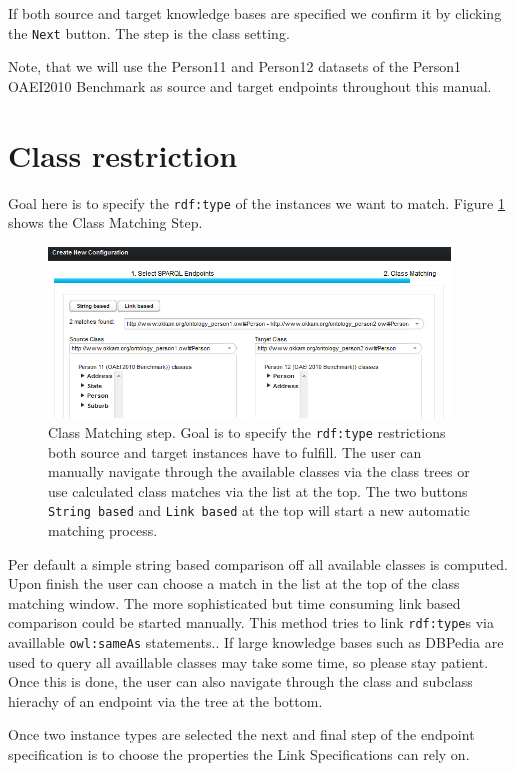 \documentclass[oneside,a4paper,12pt]{memoir}
\begin{document}
If both source and target knowledge bases are specified we confirm it by clicking the \texttt{Next} button. The step is the class setting.

 Note, that we will use the Person11 and Person12 datasets of the Person1 OAEI2010 Benchmark as source and target endpoints throughout this manual.
	\section{Class restriction}
	\label{classes}
	Goal here is to specify the \texttt{rdf:type} of the instances we want to match. Figure \ref{fig:class} shows the Class Matching Step. 
	\begin{figure}[!ht]
		\centering
		\includegraphics[width=0.95\textwidth]{images/class.png}
		\caption{Class Matching step. Goal is to specify the \texttt{rdf:type} restrictions both source and target instances have to fulfill. The user can manually navigate through the available classes via the class trees or use calculated class matches via	the list at the top. The two buttons \texttt{String based} and \texttt{Link based} at the top will start a new automatic matching process.}
		\label{fig:class}
	\end{figure}
	
	Per default a simple string based comparison off all available classes is computed. Upon finish the user can choose a match in the list at the top of the class matching window. The more sophisticated but time consuming link based comparison could be started manually. This method tries to link \texttt{rdf:type}s via availlable \texttt{owl:sameAs} statements.. If large knowledge bases such as DBPedia are used to query all availlable classes may take some time, so please stay patient. Once this is done, the user can also navigate through the class and subclass hierachy of an endpoint via the tree at the bottom.
	
	Once two instance types are selected the next and final step of the endpoint specification is to choose the properties the Link Specifications can rely on.
\end{document}
